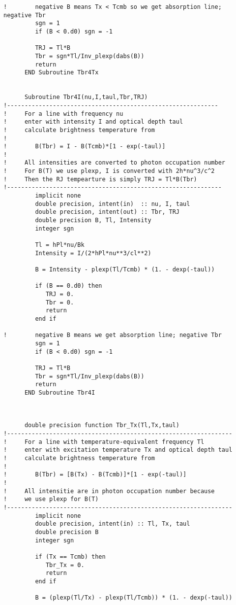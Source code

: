 \documentclass[preprint,12pt]{aastex}
\begin{document}
\begin{verbatim}
!        negative B means Tx < Tcmb so we get absorption line; negative Tbr
         sgn = 1
         if (B < 0.d0) sgn = -1

         TRJ = Tl*B
         Tbr = sgn*Tl/Inv_plexp(dabs(B))
         return
      END Subroutine Tbr4Tx


      Subroutine Tbr4I(nu,I,taul,Tbr,TRJ)
!------------------------------------------------------------
!     For a line with frequency nu
!     enter with intensity I and optical depth taul
!     calculate brightness temperature from
!
!        B(Tbr) = I - B(Tcmb)*[1 - exp(-taul)]
!
!     All intensities are converted to photon occupation number
!     For B(T) we use plexp, I is converted with 2h*nu^3/c^2
!     Then the RJ tempearture is simply TRJ = Tl*B(Tbr)
!-------------------------------------------------------------
         implicit none
         double precision, intent(in)  :: nu, I, taul
         double precision, intent(out) :: Tbr, TRJ
         double precision B, Tl, Intensity
         integer sgn

         Tl = hPl*nu/Bk
         Intensity = I/(2*hPl*nu**3/cl**2)

         B = Intensity - plexp(Tl/Tcmb) * (1. - dexp(-taul))

         if (B == 0.d0) then
            TRJ = 0.
            Tbr = 0.
            return
         end if

!        negative B means we get absorption line; negative Tbr
         sgn = 1
         if (B < 0.d0) sgn = -1

         TRJ = Tl*B
         Tbr = sgn*Tl/Inv_plexp(dabs(B))
         return
      END Subroutine Tbr4I



      double precision function Tbr_Tx(Tl,Tx,taul)
!----------------------------------------------------------------
!     For a line with temperature-equivalent frequency Tl
!     enter with excitation temperature Tx and optical depth taul
!     calculate brightness temperature from
!
!        B(Tbr) = [B(Tx) - B(Tcmb)]*[1 - exp(-taul)]
!
!     All intensitie are in photon occupation number because
!     we use plexp for B(T)
!----------------------------------------------------------------
         implicit none
         double precision, intent(in) :: Tl, Tx, taul
         double precision B
         integer sgn

         if (Tx == Tcmb) then
            Tbr_Tx = 0.
            return
         end if

         B = (plexp(Tl/Tx) - plexp(Tl/Tcmb)) * (1. - dexp(-taul))


\end{verbatim}
\end{document}
